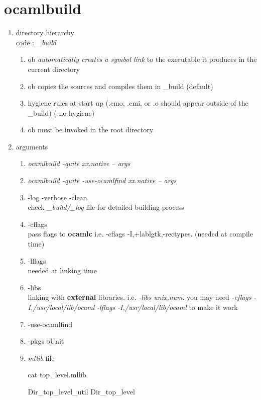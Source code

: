 
\section{ocamlbuild}
\begin{enumerate}
\item directory hierarchy \\
code : \textit{\_build}
\begin{enumerate}
\item ob \emph{automatically creates a symbol link} to the executable it
  produces in the current directory
\item ob copies the sources and compiles them in \_build (default)
\item hygiene rules at start up (.cmo, .cmi, or .o should appear
  outside of the \_build) (-no-hygiene)
\item ob must be invoked in the root directory
\end{enumerate}

\item arguments

\begin{enumerate}
\item \textit{ocamlbuild -quite xx.native -- args}
\item \textit{ocamlbuild -quite -use-ocamlfind xx.native -- args}
\item -log -verbose -clean \\
  check \textit{\_build/\_log} file for detailed building process 
\item -cflags \\
  pass flags to \textbf{ocamlc} i.e. 
  -cflags -I,+lablgtk,-rectypes. (needed at compile time)
\item -lflags \\
  needed at linking time 
\item -libs \\
   linking with \textbf{ external} libraries. i.e. \emph{-libs unix,num}.
   you may need   \emph{-cflags -I,/usr/local/lib/ocaml}  \emph{-lflags -I,/usr/local/lib/ocaml} to make it work 
\item -use-ocamlfind
\item -pkgs oUnit

\item \textit{mllib} file

  \begin{redcode}
cat top_level.mllib    
\end{redcode}
\begin{bluecode}
Dir_top_level_util
Dir_top_level  
\end{bluecode}


\end{enumerate}
\end{enumerate}
